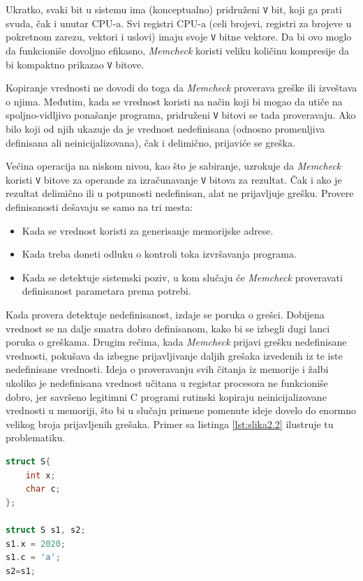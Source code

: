 \documentclass[12pt,oneside]{memoir}
\theoremstyle{plain}
\theoremstyle{definition}
\begin{document}
Ukratko, svaki bit u sistemu ima (konceptualno) pridruženi \texttt{V} bit, koji ga prati svuda, čak i unutar CPU-a. Svi registri CPU-a (celi brojevi, registri za brojeve u pokretnom zarezu, vektori i uslovi) imaju svoje \texttt{V} bitne vektore. Da bi ovo moglo da funkcioniše dovoljno efikasno, \textit{Memcheck} koristi veliku količinu kompresije da bi kompaktno prikazao \texttt{V} bitove.

Kopiranje vrednosti ne dovodi do toga da \textit{Memcheck} proverava greške ili izveštava o njima. Međutim, kada se vrednost koristi na način koji bi mogao da utiče na spoljno-vidljivo ponašanje programa, pridruženi \texttt{V} bitovi se tada proveravaju. Ako bilo koji od njih ukazuje da je vrednost nedefinisana (odnosno promenljiva definisana ali neinicijalizovana), čak i delimično, prijaviće se greška.

Većina operacija na niskom nivou, kao što je sabiranje, uzrokuje da \textit{Memcheck} koristi \texttt{V} bitove za operande za izračunavanje \texttt{V} bitova za rezultat. Čak i ako je rezultat delimično ili u potpunosti nedefinisan, alat ne prijavljuje grešku. Provere definisanosti dešavaju se samo na tri mesta:
\begin{itemize}
\item  Kada se vrednost koristi za generisanje memorijske adrese.
\item  Kada treba doneti odluku o kontroli toka izvršavanja programa. 
\item  Kada se detektuje sistemski poziv, u kom slučaju će \textit{Memcheck} proveravati definisanost parametara prema potrebi.
\end{itemize}

Kada provera detektuje nedefinisanost, izdaje se poruka o grešci. Dobijena vrednost se na dalje smatra dobro definisanom, kako bi se izbegli dugi lanci poruka o greškama. Drugim rečima, kada \textit{Memcheck} prijavi grešku nedefinisane vrednosti, pokušava da izbegne prijavljivanje daljih grešaka izvedenih iz te iste nedefinisane vrednosti. Ideja o proveravanju svih čitanja iz memorije i žalbi ukoliko je nedefinisana vrednost učitana u registar procesora ne funkcioniše dobro, jer savršeno legitimni C programi rutinski kopiraju neinicijalizovane vrednosti u memoriji, što bi u slučaju primene pomenute ideje dovelo do enormno velikog broja prijavljenih grešaka. Primer sa listinga \ref{lst:slika2.2} ilustruje tu problematiku.

\begin{lstlisting}[style=mystyle,caption={Primer kratkog segmenta koda}, label={lst:slika2.2},language={C}] 
struct S{
	int x;
	char c;
};

struct S s1, s2;
s1.x = 2020;
s1.c = 'a';
s2=s1;
\end{lstlisting}
\end{document}
